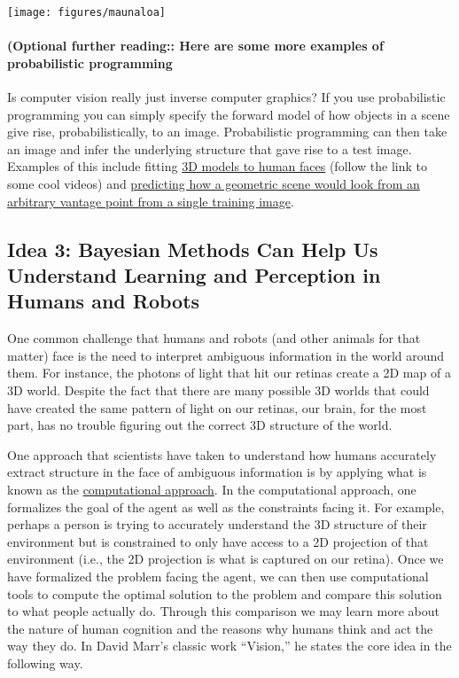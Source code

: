 \documentclass[assignment01_Solutions]{subfiles}
\begin{document}
\begin{center}
\texttt{[image: figures/maunaloa]}
\end{center}

\paragraph{(Optional further reading:: Here are some more examples of probabilistic programming}
Is computer vision really just inverse computer graphics?  If you use probabilistic programming you can simply specify the forward model of how objects in a scene give rise, probabilistically, to an image. Probabilistic programming can then take an image and infer the underlying structure that gave rise to a test image.  Examples of this include fitting  \href{http://mrkulk.github.io/www_cvpr15/}{3D models to human faces} (follow the link to some cool videos) and \href{https://science.sciencemag.org/content/sci/360/6394/1204.full.pdf}{predicting how a geometric scene would look from an arbitrary vantage point from a single training image}.


\subsection*{Idea 3: Bayesian Methods Can Help Us Understand Learning and Perception in Humans and Robots}

One common challenge that humans and robots (and other animals for that matter) face is the need to interpret ambiguous information in the world around them.  For instance, the photons of light that hit our retinas create a 2D map of a 3D world.  Despite the fact that there are many possible 3D worlds that could have created the same pattern of light on our retinas, our brain, for the most part, has no trouble figuring out the correct 3D structure of the world.

One approach that scientists have taken to understand how humans accurately extract structure in the face of ambiguous information is by applying what is known as the \href{https://www.cse.huji.ac.il/~yweiss/intro/node2.html}{computational approach}.  In the computational approach, one formalizes the goal of the agent as well as the constraints facing it.  For example, perhaps a person is trying to accurately understand the 3D structure of their environment but is constrained to only have access to a 2D projection of that environment (i.e., the 2D projection is what is captured on our retina).  Once we have formalized the problem facing the agent, we can then use computational tools to compute the optimal solution to the problem and compare this solution to what people actually do.  Through this comparison we may learn more about the nature of human cognition and the reasons why humans think and act the way they do.  In David Marr's classic work ``Vision,'' he states the core idea in the following way.
\end{document}
